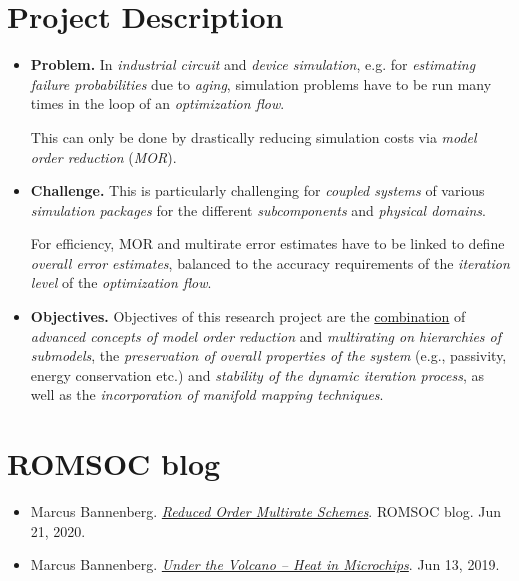 \documentclass{book}
\numberwithin{equation}{section}
\begin{document}
\section{Project Description}
\begin{itemize}
    \item \textbf{Problem.} In \textit{industrial circuit} and \textit{device simulation}, e.g. for \textit{estimating failure probabilities} due to \textit{aging}, simulation problems have to be run many times in the loop of an \textit{optimization flow}.
    
    This can only be done by drastically reducing simulation costs via \textit{model order reduction} (\textit{MOR}).
    \item \textbf{Challenge.} This is particularly challenging for \textit{coupled systems} of various \textit{simulation packages} for the different \textit{subcomponents} and \textit{physical domains}.
    
    For efficiency, MOR and multirate error estimates have to be linked to define \textit{overall error estimates}, balanced to the accuracy requirements of the \textit{iteration level} of the \textit{optimization flow}.
    \item \textbf{Objectives.} Objectives of this research project are the \underline{combination} of \textit{advanced concepts of model order reduction} and \textit{multirating on hierarchies of submodels}, the \textit{preservation of overall properties of the system} (e.g., passivity, energy conservation etc.) and \textit{stability of the dynamic iteration process}, as well as the \textit{incorporation of manifold mapping techniques}.
\end{itemize}

\section{ROMSOC blog}
\begin{itemize}
    \item Marcus Bannenberg. \href{https://www.romsoc.eu/reduced-order-multirate-schemes/}{\textit{Reduced Order Multirate Schemes}}. ROMSOC blog. Jun 21, 2020.
    \item Marcus Bannenberg. \href{https://www.romsoc.eu/under-the-volcano-heat-in-microchips/}{\textit{Under the Volcano -- Heat in Microchips}}. Jun 13, 2019.
\end{itemize}
\end{document}
